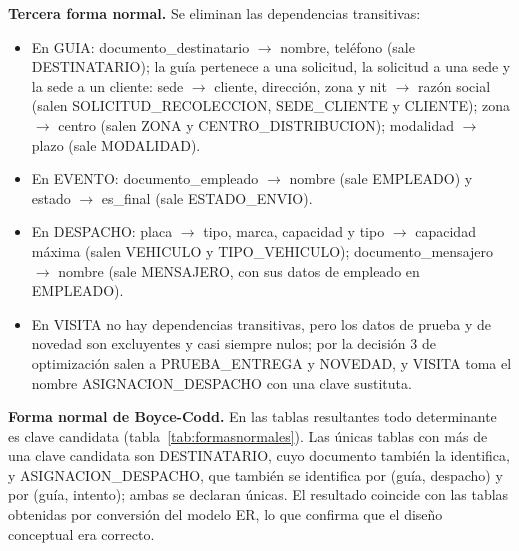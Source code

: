 \textbf{Tercera forma normal.} Se eliminan las dependencias
transitivas:

\begin{itemize}[leftmargin=1.2cm,itemsep=1pt]
  \item En GUIA: documento\_destinatario $\rightarrow$ nombre, teléfono
        (sale DESTINATARIO); la guía pertenece a una solicitud, la
        solicitud a una sede y la sede a un cliente: sede $\rightarrow$
        cliente, dirección, zona y nit $\rightarrow$ razón social (salen
        SOLICITUD\_RECOLECCION, SEDE\_CLIENTE y CLIENTE); zona
        $\rightarrow$ centro (salen ZONA y CENTRO\_DISTRIBUCION);
        modalidad $\rightarrow$ plazo (sale MODALIDAD).
  \item En EVENTO: documento\_empleado $\rightarrow$ nombre (sale
        EMPLEADO) y estado $\rightarrow$ es\_final (sale ESTADO\_ENVIO).
  \item En DESPACHO: placa $\rightarrow$ tipo, marca, capacidad y tipo
        $\rightarrow$ capacidad máxima (salen VEHICULO y TIPO\_VEHICULO);
        documento\_mensajero $\rightarrow$ nombre (sale MENSAJERO, con
        sus datos de empleado en EMPLEADO).
  \item En VISITA no hay dependencias transitivas, pero los datos de
        prueba y de novedad son excluyentes y casi siempre nulos; por la
        decisión 3 de optimización salen a PRUEBA\_ENTREGA y NOVEDAD, y
        VISITA toma el nombre ASIGNACION\_DESPACHO con una clave
        sustituta.
\end{itemize}

\textbf{Forma normal de Boyce-Codd.} En las tablas resultantes todo
determinante es clave candidata (tabla~\ref{tab:formasnormales}). Las
únicas tablas con más de una clave candidata son DESTINATARIO, cuyo
documento también la identifica, y ASIGNACION\_DESPACHO, que también se
identifica por (guía, despacho) y por (guía, intento); ambas se declaran
únicas. El resultado coincide con las tablas obtenidas por conversión
del modelo ER, lo que confirma que el diseño conceptual era correcto.

